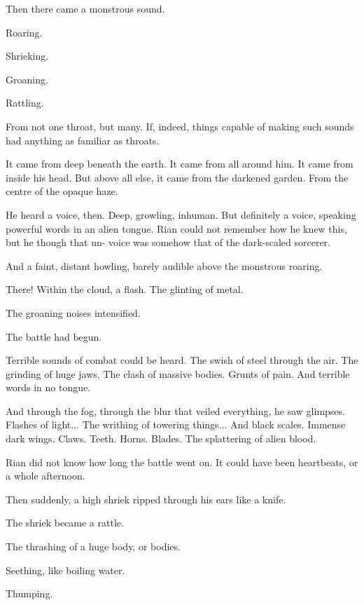 Then there came a monstrous sound. 

Roaring. 

Shrieking. 

Groaning. 

Rattling. 

From not one throat, but many. If, indeed, things capable of making such sounds had anything as familiar as throats. 

It came from deep beneath the earth. It came from all around him. It came from inside his head. But above all else, it came from the darkened garden. From the centre of the opaque haze. 

He heard a voice, then. Deep, growling, inhuman. But definitely a voice, speaking powerful words in an alien tongue. 
 Rian could not remember how he knew this, but he though that un-\scathaese{} voice was somehow that of the dark-scaled sorcerer. 

And a faint, distant howling, barely audible above the monstrous roaring. 

There! Within the cloud, a flash. The glinting of metal. 


The groaning noises intensified. 

The battle had begun. 

Terrible sounds of combat could be heard. 
The swish of steel through the air. 
The grinding of huge jaws. 
The clash of massive bodies. 
Grunts of pain. 
And terrible words in no \human{} tongue. 

And through the fog, through the blur that veiled everything, he saw glimpses. Flashes of light...  
The writhing of towering things... 
And black scales. Immense dark wings. Claws. Teeth. Horns. Blades. 
The splattering of alien blood. 

Rian did not know how long the battle went on. It could have been heartbeats, or a whole afternoon.  

Then suddenly, a high shriek ripped through his ears like a knife. 

The shriek became a rattle. 

The thrashing of a huge body, or bodies.

Seething, like boiling water. 

Thumping. 


